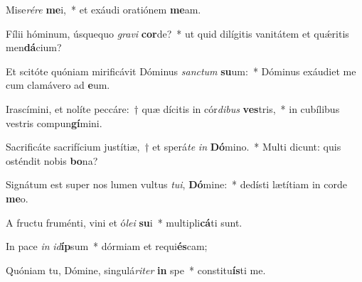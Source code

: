 \item Mise\textit{ré}\textit{re} \textbf{me}i,~* et exáudi oratiónem \textbf{me}am.
\item Fílii hóminum, úsquequo \textit{gra}\textit{vi} \textbf{cor}de?~* ut quid dilígitis vanitátem et quǽritis men\textbf{dá}cium?
\item Et scitóte quóniam mirificávit Dóminus \textit{sanc}\textit{tum} \textbf{su}um:~* Dóminus exáudiet me cum clamávero ad \textbf{e}um.
\item Irascímini, et nolíte peccáre:~† quæ dícitis in cór\textit{di}\textit{bus} \textbf{ves}tris,~* in cubílibus vestris compun\textbf{gí}mini.
\item Sacrificáte sacrifícium justítiæ,~† et sperá\textit{te} \textit{in} \textbf{Dó}mino.~* Multi dicunt: quis osténdit nobis \textbf{bo}na?
\item Signátum est super nos lumen vultus \textit{tu}\textit{i}, \textbf{Dó}mine:~* dedísti lætítiam in corde \textbf{me}o.
\item A fructu fruménti, vini et ó\textit{le}\textit{i} \textbf{su}i~* multipli\textbf{cá}ti sunt.
\item In pace \textit{in} \textit{id}\textbf{íp}sum~* dórmiam et requi\textbf{és}cam;
\item Quóniam tu, Dómine, singulá\textit{ri}\textit{ter} \textbf{in} spe~* constitu\textbf{ís}ti me.
